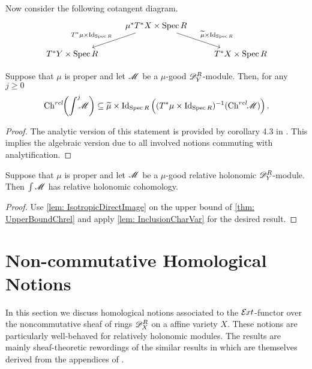   Now consider the following cotangent diagram.
  $$
  \begin{tikzcd}
      & \mu^* T^* X\times \Spec R\arrow[swap]{ld}{T^* \mu \times \operatorname{Id}_{\Spec R}} \arrow{rd}{\widetilde{\mu}\times \operatorname{Id}_{\Spec R}} & \\
      T^* Y \times \Spec R& & T^*X\times \Spec R
  \end{tikzcd}
  $$
  \begin{theorem}\label{thm: UpperBoundChrel}
    Suppose that $\mu$ is proper and let $\mathscr{M}$ be a $\mu$-good $\mathscr{D}_Y^R$-module. Then, for any $j\geq 0$
    $$\operatorname{Ch}^{rel}\mkern-5mu\left(\int^j \mkern -8mu \mathscr{M} \right)\subseteq  \widetilde{\mu}\times \operatorname{Id}_{\operatorname{Spec} R}\left((T^*\mu \times \operatorname{Id}_{\operatorname{Spec} R})^{-1}(\operatorname{Ch}^{rel}\mkern-5mu \mathscr{M}) \right).$$
  \end{theorem}
  \begin{proof}
    The analytic version of this statement is provided by corollary 4.3 in \cite{schapira1994index}.
    This implies the algebraic version due to all involved notions commuting with analytification.
  \end{proof}
  \begin{theorem}\label{thm: RelHolConserved}
      Suppose that $\mu$ is proper and let $\mathscr{M}$ be a $\mu$-good relative holonomic $\mathscr{D}_Y^R$-module. Then $\int \mathscr{M}$ has relative holonomic cohomology.
  \end{theorem}
  \begin{proof}
    Use \cref{lem: IsotropicDirectImage} on the upper bound of \cref{thm: UpperBoundChrel} and apply \cref{lem: InclusionCharVar} for the desired result.
  \end{proof}
\section{Non-commutative Homological Notions}\label{sec: NonComHomological}
In this section we discuss homological notions associated to the $\mathcal{E}\mkern -1mu xt$-functor over the noncommutative sheaf of rings $\mathscr{D}_X^R$ on a affine variety $X$.
These notions are particularly well-behaved for relatively holonomic modules.
The results are mainly sheaf-theoretic rewordings of the similar results in \cite{budur2019zero} which are themselves derived from the appendices of \cite{bjork1993analytic}.
